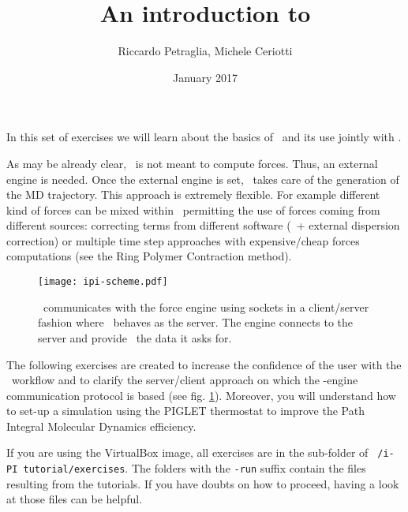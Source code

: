 \documentclass{article}
\title{An introduction to \ipi{}}
\author{Riccardo Petraglia, Michele Ceriotti}
\date{January 2017}
\begin{document}
\maketitle

In this set of exercises we will learn about the basics of \ipi\ and
its use jointly with \qe.

As may be already clear, \ipi\ is not meant to compute forces. Thus,
an external engine is needed. Once the external engine is set, \ipi\
takes care of the generation of the MD trajectory. This approach
is extremely flexible. For example different kind of forces can be
mixed within \ipi\ permitting the use of forces coming from different
sources: correcting terms from different software (\PWscf~+ external
dispersion correction) or multiple time step approaches with
expensive/cheap forces computations (see the Ring Polymer Contraction
method).

\begin{figure}[h!]
\centering
\texttt{[image: ipi-scheme.pdf]}
\caption{\ipi\ communicates with the force engine using sockets in a
  client/server fashion where \ipi\ behaves as the server. The engine
  connects to the server and provide \ipi\ the data it asks
  for.}\label{fig:ipi-scheme}
\end{figure}


The following exercises are created to increase the confidence of the user
with the \ipi\ workflow and to clarify the server/client approach on
which the \ipi-engine communication protocol is based (see
fig. \ref{fig:ipi-scheme}). Moreover, you will understand how to
set-up a simulation using the PIGLET thermostat to improve the Path
Integral Molecular Dynamics efficiency.


If you are using the VirtualBox image, all exercises are in the
sub-folder of \texttt{~/i-PI tutorial/exercises}. The folders with the
\texttt{-run} suffix contain the files resulting from the
tutorials. If you have doubts on how to proceed, having a look at
those files can be helpful.
\end{document}
